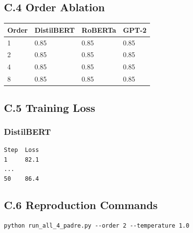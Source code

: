 \subsection{C.4 Order Ablation}

\begin{table}[H]
\centering
\small
\begin{tabular}{llll}
\toprule
\textbf{Order} & \textbf{DistilBERT} & \textbf{RoBERTa} & \textbf{GPT-2} \\
\midrule
1 & 0.85 & 0.85 & 0.85 \\
2 & 0.85 & 0.85 & 0.85 \\
4 & 0.85 & 0.85 & 0.85 \\
8 & 0.85 & 0.85 & 0.85 \\
\bottomrule
\end{tabular}
\end{table}

\subsection{C.5 Training Loss}

\subsubsection{DistilBERT}
\begin{lstlisting}
Step  Loss
1     82.1
...
50    86.4
\end{lstlisting}

\subsection{C.6 Reproduction Commands}

\begin{lstlisting}
python run_all_4_padre.py --order 2 --temperature 1.0
\end{lstlisting}


